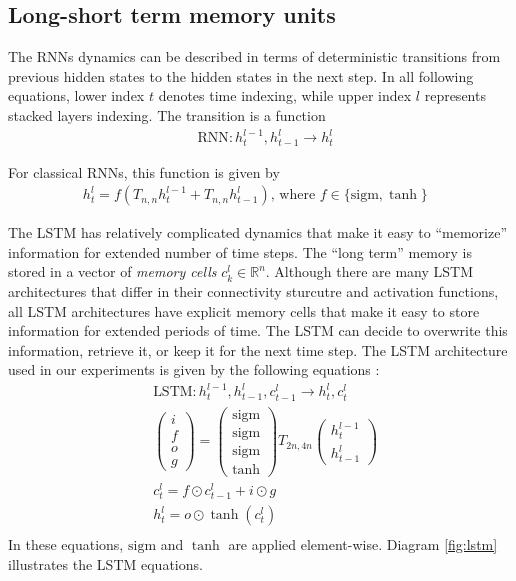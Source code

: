 \documentclass{article}
\begin{document}
\subsection{Long-short term memory units}
\label{sec:lstm}

The RNNs dynamics can be described in terms of deterministic transitions
from previous hidden states to the hidden states in the next step. 
In all following equations, lower index $t$ denotes time indexing, while upper index $l$ represents stacked layers indexing.
The transition is a function
\begin{align*}
  &\text{RNN} : h^{l-1}_t, h^l_{t-1} \rightarrow h^l_t
\end{align*}

For classical RNNs, this function is given by
\begin{align*}
  h^l_t = f(T_{n,n}h^{l-1}_t + T_{n,n}h^l_{t-1}) \text{, where $f \in \{\mathrm{sigm}, \tanh\}$ }
\end{align*}

The LSTM has relatively complicated dynamics that make it easy to
``memorize'' information for extended number of time steps.  The
``long term'' memory is stored in a vector of \emph{memory cells}
$c^l_k \in \mathbb{R}^n$.  Although there are many LSTM architectures
that differ in their connectivity sturcutre and activation functions,
all LSTM architectures have explicit memory cells that make it easy to
store information for extended periods of time.  The LSTM can decide
to overwrite this information, retrieve it, or keep it for the next time
step.  The LSTM architecture used in our experiments is given by the
following equations \cite{graves2013speech}:
\begin{align*}
&\text{LSTM} : h^{l-1}_t, h^l_{t-1}, c^l_{t - 1} \rightarrow h^l_t, c^l_t\\
&\begin{pmatrix}i\\f\\o\\g\end{pmatrix} =
  \begin{pmatrix}\mathrm{sigm}\\\mathrm{sigm}\\\mathrm{sigm}\\\tanh\end{pmatrix}
  T_{2n,4n}\begin{pmatrix}h^{l - 1}_t\\h^l_{t-1}\end{pmatrix}\\
&c^l_t = f \odot c^l_{t-1} + i \odot g\\
&h^l_t = o \odot \tanh(c^l_t)\\
\end{align*}
In these equations, $\mathrm{sigm}$ and $\tanh$ are applied
element-wise. Diagram \ref{fig:lstm} illustrates the LSTM
equations.
\end{document}
